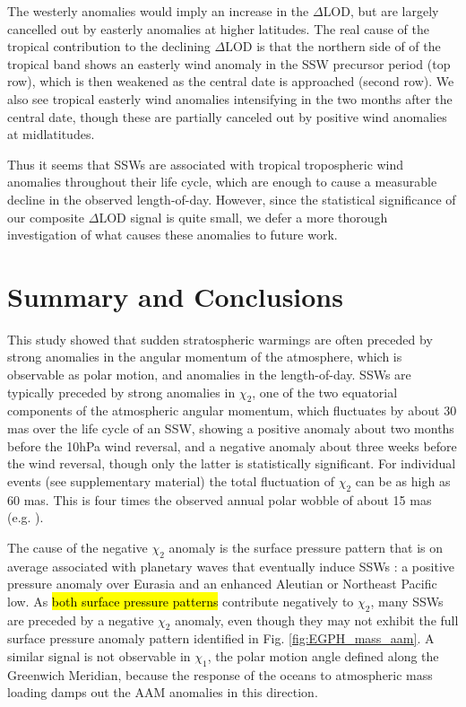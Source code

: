 \documentclass[draft,jgrga]{agutex}
\begin{document}
\begin{article}
 {The westerly anomalies would imply an increase in the $\Delta$LOD, but are largely cancelled out by easterly anomalies at higher latitudes.  
The real cause of the tropical contribution to the declining $\Delta$LOD is that the northern side of of the tropical band shows an easterly wind anomaly in the SSW precursor period (top row), which is then weakened as the central date is approached (second row).
We also see  tropical easterly wind anomalies intensifying in the two months after the central date, though these are partially canceled out by positive wind anomalies at midlatitudes.}

Thus it seems that SSWs are associated with tropical tropospheric wind anomalies throughout their life cycle, which are enough to cause a measurable decline in the observed length-of-day.
However, since the statistical significance of our composite $\Delta$LOD signal is quite small, we defer a more thorough investigation of what causes these anomalies to future work.


\section{Summary and Conclusions}
\label{sec:conclusions}

This study showed that sudden stratospheric warmings  {are often preceded by strong anomalies in the angular momentum of the atmosphere, which is observable as polar motion, and anomalies in the length-of-day.}
SSWs are typically preceded by  strong anomalies in  {$\chi_2$, one of the two equatorial components of the atmospheric angular momentum, which} fluctuates by about 30 mas over the life cycle of an SSW, showing a positive anomaly about two months before the 10hPa wind reversal, and a negative anomaly about three weeks before the wind reversal, though only the latter is statistically significant.  
 {For individual events (see supplementary material)} the total fluctuation of $\chi_2$ can be as high as  60 mas.
This is four times the observed annual polar wobble of about 15 mas (e.g. \cite{dobslawetal2010}).

The cause of the negative $\chi_2$ anomaly  is the  {surface} pressure pattern that is  {on average associated with} planetary waves that eventually induce SSWs \citep{Garfinkel2010, Kodera2013}: a positive pressure anomaly over Eurasia and an enhanced Aleutian  {or Northeast Pacific} low.
 As \hl{both surface pressure patterns} contribute negatively to $\chi_2$, many SSWs are preceded by a negative $\chi_2$ anomaly, even though they may not exhibit the full surface pressure anomaly pattern identified in Fig. \ref{fig:EGPH_mass_aam}.
A similar signal is not observable in $\chi_1$, the polar motion angle defined along the Greenwich Meridian, because the response of the oceans to atmospheric mass loading damps out the AAM anomalies in this direction.


\end{article}
\end{document}
